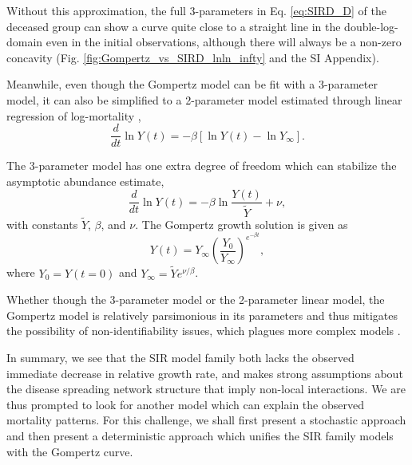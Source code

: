 \documentclass{article}
\begin{document}
Without this approximation, the full 3-parameters in Eq. \ref{eq:SIRD_D} of the deceased group can show a curve quite close to a straight line in the double-log-domain even in the initial observations, although there will always be a non-zero concavity (Fig. \ref{fig:Gompertz_vs_SIRD_lnln_infty} and the SI Appendix).

Meanwhile, even though the Gompertz model can be fit with a 3-parameter model, it can also be simplified to a 2-parameter model estimated through linear regression of log-mortality \cite{Levitt2020},
\begin{equation}
\label{eq:GompertzODE2param}
\frac{d}{dt}\ln{Y(t)} = -\beta\left[\ln{Y(t)} - \ln {Y_{\infty}}\right].
\end{equation}

The 3-parameter model has one extra degree of freedom which can stabilize the asymptotic abundance estimate, 
\begin{equation}
\label{eq:GompertzODE}
\frac{d}{dt}\ln{Y(t)} = -\beta\ln{\frac{Y(t)}{\tilde{Y}}} + \nu,
\end{equation} 
with constants $\tilde{Y}$, $\beta$, and $\nu$. The Gompertz growth solution is given as
\begin{equation}
\label{eq:gomp_solution}
Y(t) = Y_\infty \left(\frac{Y_0}{Y_\infty}\right)^{e^{-\beta t}},
\end{equation}
where $Y_{0}=Y(t = 0)$ and $Y_{\infty}=\tilde{Y}e^{\nu/\beta}$.

Whether though the 3-parameter model or the 2-parameter linear model, the Gompertz model is relatively parsimonious in its parameters and thus mitigates the possibility of non-identifiability issues, which plagues more complex models \cite{roda2020difficult}.

In summary, we see that the SIR model family both lacks the observed immediate decrease in relative growth rate, and makes strong assumptions about the disease spreading network structure that imply non-local interactions. We are thus prompted to look for another model which can explain the observed mortality patterns. For this challenge, we shall first present a stochastic approach and then present a deterministic approach which unifies the SIR family models with the Gompertz curve.
\end{document}
